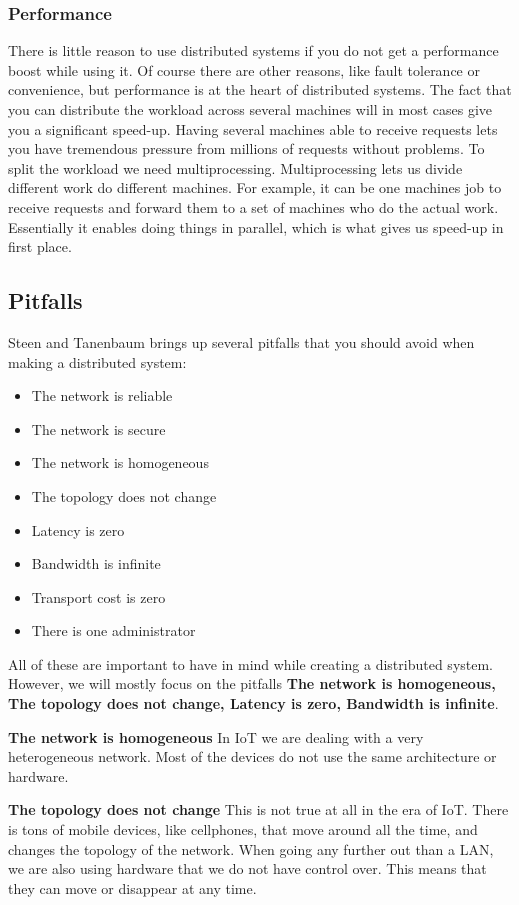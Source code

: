 \subsubsection{Performance}
There is little reason to use distributed systems if you do not get a performance boost while using it. Of course there are other reasons, like fault tolerance or convenience, but performance is at the heart of distributed systems. The fact that you can distribute the workload across several machines will in most cases give you a significant speed-up. Having several machines able to receive requests lets you have tremendous pressure from millions of requests without problems.
To split the workload we need multiprocessing. Multiprocessing lets us divide different work do different machines. For example, it can be one machines job to receive requests and forward them to a set of machines who do the actual work. Essentially it enables doing things in parallel, which is what gives us speed-up in first place.

\subsection{Pitfalls}
Steen and Tanenbaum \cite{steen_distributed_2017} brings up several pitfalls that you should avoid when making a distributed system:
\begin{itemize}
    \item The network is reliable
    \item The network is secure
    \item The network is homogeneous
    \item The topology does not change
    \item Latency is zero
    \item Bandwidth is infinite
    \item Transport cost is zero
    \item There is one administrator
\end{itemize}
All of these are important to have in mind while creating a distributed system. However, we will mostly focus on the pitfalls \textbf{The network is homogeneous, The topology does not change, Latency is zero, Bandwidth is infinite}.

\textbf{The network is homogeneous}
In IoT we are dealing with a very heterogeneous network. Most of the devices do not use the same architecture or hardware.

\textbf{The topology does not change}
This is not true at all in the era of IoT. There is tons of mobile devices, like cellphones, that move around all the time, and changes the topology of the network. When going any further out than a LAN, we are also using hardware that we do not have control over. This means that they can move or disappear at any time.

